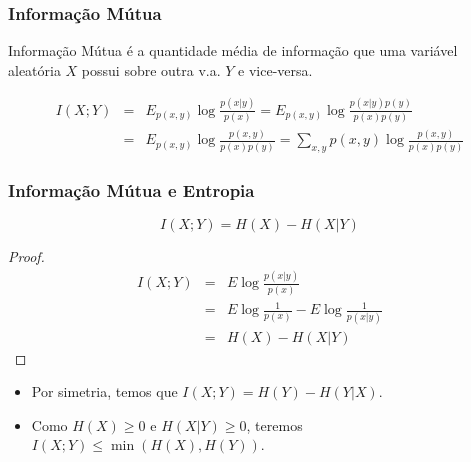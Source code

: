 \begin{frame}%
  \frametitle{Informação Mútua}
  Informação Mútua é a quantidade média de informação que uma variável aleatória 
  $X$ possui sobre outra v.a. $Y$ e vice-versa.

  \begin{definition}\label{def-inf-mut}
    \begin{eqnarray}
    I(X;Y) &=& E_{p(x,y)} \log \frac{p(x|y)}{p(x)} = E_{p(x,y)} \log \frac{p(x|y)p(y)}{p(x)p(y)} \nonumber \\
        &=& E_{p(x,y)} \log \frac{p(x,y)}{p(x)p(y)} = \sum_{x,y} p(x,y) \log \frac{p(x,y)}{p(x)p(y)}
    \end{eqnarray}
  \end{definition}
\end{frame}

\begin{frame}%
  \frametitle{Informação Mútua e Entropia}
  \begin{proposition}
    \begin{equation}
        I(X;Y) = H(X) - H(X|Y)
    \end{equation}
  \end{proposition}
  \begin{proof}
    \vspace{-0.3cm}
    \begin{eqnarray} 
        I(X;Y)  &=& E \log \frac{p(x|y)}{p(x)} \nonumber \\
                &=& E \log \frac{1}{p(x)} - E \log \frac{1}{p(x|y)} \nonumber \\
                &=& H(X) - H(X|Y)
    \end{eqnarray}
  \end{proof}

  \begin{itemize}
  \item Por simetria, temos que $I(X;Y) = H(Y) - H(Y|X)$.
  \item Como $H(X) \geq 0$ e $H(X|Y) \geq 0$, teremos $I(X;Y) \leq \min (H(X),H(Y))$.
  \end{itemize}
\end{frame}

